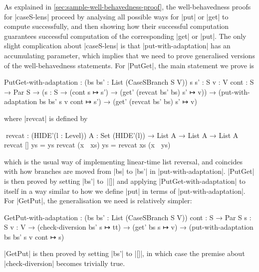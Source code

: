 \documentclass{sigplanconf}
\begin{document}
As explained in \autoref{sec:sample-well-behavedness-proof}, the well-behavedness proofs for |caseS-lens| proceed by analysing all possible ways for |put| or |get| to compute successfully, and then showing how their successful computation guarantees successful computation of the corresponding |get| or |put|.
The only slight complication about |caseS-lens| is that |put-with-adaptation| has an accumulating parameter, which implies that we need to prove generalised versions of the well-behavedness statements.
For |PutGet|, the main statement we prove is
\begin{code}
PutGet-with-adaptation :
  (bs bs' : List (CaseSBranch S V))
  {s s' : S} {v : V} {cont : S → Par S} →
  ({s : S} →  (cont s ↦ s') → (get' (revcat bs' bs) s' ↦ v)) →
  (put-with-adaptation bs bs' s v cont ↦ s') →
  (get' (revcat bs' bs) s' ↦ v)
\end{code}
where |revcat| is defined by
\begin{code}
^^^revcat : (HIDE'({l : Level})) {A : Set (HIDE'(l))} → List A → List A → List A
revcat []        ys = ys
revcat (x ∷ xs)  ys = revcat xs (x ∷ ys)
\end{code}
which is the usual way of implementing linear-time list reversal, and coincides with how branches are moved from |bs| to |bs'| in |put-with-adaptation|.
|PutGet| is then proved by setting |bs'| to~|[]| and applying |PutGet-with-adaptation| to itself in a way similar to how we define |put| in terms of |put-with-adaptation|.
For |GetPut|, the generalisation we need is relatively simpler:
\begin{code}
GetPut-with-adaptation :
  (bs bs' : List (CaseSBranch S V))
  {cont : S → Par S} {s : S} {v : V} →
  (check-diversion bs' s ↦ tt) →
  (get' bs s ↦ v) → (put-with-adaptation bs bs' s v cont ↦ s)
\end{code}
|GetPut| is then proved by setting |bs'| to |[]|, in which case the premise about |check-diversion| becomes trivially true.
\end{document}
